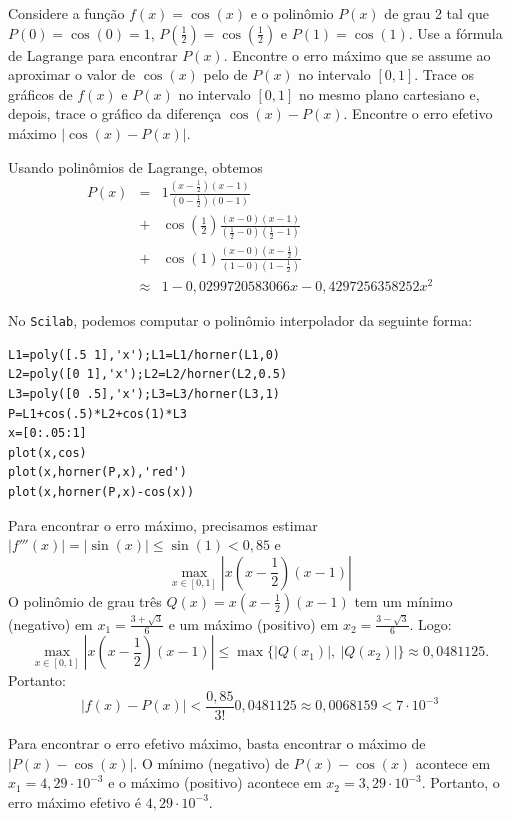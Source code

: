 \begin{ex}
Considere a função $f(x)=\cos(x)$ e o polinômio $P(x)$ de grau 2 tal que $P(0)=\cos(0)=1$, $P(\frac{1}{2})=\cos(\frac{1}{2})$ e $P(1)=\cos(1)$. Use a fórmula de Lagrange para encontrar $P(x)$. Encontre o erro máximo que se assume ao aproximar o valor de $\cos(x)$ pelo de $P(x)$ no intervalo $[0,1]$. Trace os gráficos de $f(x)$ e $P(x)$ no intervalo $[0,1]$ no mesmo plano cartesiano e, depois, trace o gráfico da diferença $\cos(x)-P(x)$. Encontre o erro efetivo máximo $|\cos(x)-P(x)|$.
\end{ex}
\begin{sol}
  Usando polinômios de Lagrange, obtemos
  \begin{eqnarray*}
    P(x) &=& 1\frac{(x-\frac{1}{2})(x-1)}{(0-\frac{1}{2})(0-1)}\\
    &+& \cos\left(\frac{1}{2}\right)\frac{(x-0)(x-1)}{(\frac{1}{2}-0)(\frac{1}{2}-1)}\\
    &+& \cos(1)\frac{(x-0)(x-\frac{1}{2})}{(1-0)(1-\frac{1}{2})}\\
    &\approx&   1 - 0,0299720583066x - 0,4297256358252x^2
\end{eqnarray*}

\ifisscilab
No \verb+Scilab+, podemos computar o polinômio interpolador da seguinte forma:  
\begin{verbatim}
L1=poly([.5 1],'x');L1=L1/horner(L1,0)
L2=poly([0 1],'x');L2=L2/horner(L2,0.5)
L3=poly([0 .5],'x');L3=L3/horner(L3,1)
P=L1+cos(.5)*L2+cos(1)*L3
x=[0:.05:1]
plot(x,cos)
plot(x,horner(P,x),'red')
plot(x,horner(P,x)-cos(x))
\end{verbatim}
\fi

Para encontrar o erro máximo, precisamos estimar $|f'''(x)|=|\sin(x)|\leq \sin(1)<0,85$ e
$$
\max_{x\in[0,1]} \left|x\left(x-\frac{1}{2}\right)(x-1)\right|
$$
O polinômio de grau três $Q(x)=x\left(x-\frac{1}{2}\right)(x-1)$ tem um mínimo (negativo) em $x_1=\frac{3+\sqrt{3}}{6}$ e um máximo (positivo) em $x_2=\frac{3-\sqrt{3}}{6}$. Logo:
$$
\max_{x\in[0,1]} \left|x\left(x-\frac{1}{2}\right)(x-1)\right|\leq \max\{|Q(x_1)|,\ |Q(x_2)|\}\approx 0,0481125.
$$
Portanto:
$$
|f(x)-P(x)|< \frac{0,85}{3!}0,0481125\approx 0,0068159<7\cdot 10^{-3}
$$

Para encontrar o erro efetivo máximo, basta encontrar o máximo de $|P(x)-\cos(x)|$. O mínimo (negativo) de $P(x)-\cos(x)$ acontece em $x_1=4,29\cdot 10^{-3}$ e o máximo (positivo) acontece em $x_2=3,29\cdot 10^{-3}$. Portanto, o erro máximo efetivo é $4,29\cdot 10^{-3}$.
\end{sol}


